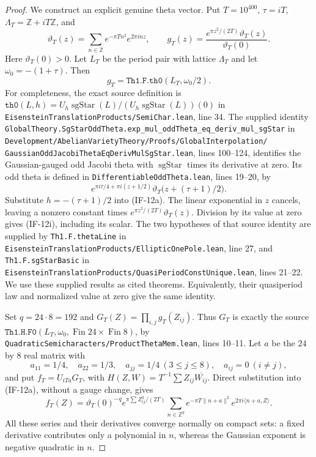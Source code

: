 \begin{proof}
We construct an explicit genuine theta vector. Put $T=10^{400}$,
$\tau=iT$, $\Lambda_T=\mathbb Z+iT\mathbb Z$, and
\[
 \vartheta_T(z)=\sum_{n\in\mathbb Z}
                   e^{-\pi T n^2}e^{2\pi i n z},\qquad
 g_T(z)=\frac{e^{\pi z^2/(2T)}\vartheta_T(z)}{\vartheta_T(0)}.
                                                               \tag{IF-12h}
\]
Here $\vartheta_T(0)>0$. Let $L_T$ be the period pair with lattice
$\Lambda_T$ and let $\omega_0=-(1+\tau)$. Then
\[
                g_T=\texttt{Th1.F.th0}(L_T,\omega_0/2).
                                                               \tag{IF-12i}
\]
For completeness, the exact source definition is
$\texttt{th0}(L,h)=U_h\operatorname{sgStar}(L)/
(U_h\operatorname{sgStar}(L))(0)$ in
\texttt{EisensteinTranslationProducts/SemiChar.lean}, line 34.
The supplied identity
\texttt{GlobalTheory.SgStarOddTheta.exp\_mul\_oddTheta\_eq\_deriv\_mul\_sgStar}
in \texttt{Development/AbelianVarietyTheory/Proofs/GlobalInterpolation/}
\texttt{GaussianOddJacobiThetaEqDerivMulSgStar.lean}, lines 100--124,
identifies the Gaussian-gauged odd Jacobi theta with
$\operatorname{sgStar}$ times its derivative at zero. Its odd theta
is defined in \texttt{DifferentiableOddTheta.lean}, lines 19--20, by
\[
 e^{\pi i\tau/4+\pi i(z+1/2)}
       \vartheta_T\bigl(z+(\tau+1)/2\bigr).
\]
Substitute $h=-(\tau+1)/2$ into (IF-12a). The linear exponential
in $z$ cancels, leaving a nonzero constant times
$e^{\pi z^2/(2T)}\vartheta_T(z)$. Division by its value at zero
gives (IF-12i), including its scalar. The two hypotheses of that
source identity are supplied by \texttt{Th1.F.thetaLine} in
\texttt{EisensteinTranslationProducts/EllipticOnePole.lean}, line 27,
and \texttt{Th1.F.sgStarBasic} in
\texttt{EisensteinTranslationProducts/QuasiPeriodConstUnique.lean},
lines 21--22. We use these supplied results as cited theorems.
Equivalently, their
quasiperiod law and normalized value at zero give the same identity.

Set $q=24\cdot8=192$ and
$G_T(Z)=\prod_{i,j}g_T(Z_{ij})$. Thus $G_T$ is exactly the source
$\texttt{Th1.H.F0}(L_T,\omega_0,\operatorname{Fin}24\times
\operatorname{Fin}8)$, by
\texttt{QuadraticSemicharacters/ProductThetaMem.lean}, lines 10--11.
Let $a$ be the $24$ by $8$ real matrix with
\[
 a_{11}=1/4,\quad a_{22}=1/3,\quad
 a_{jj}=1/4\ (3\le j\le8),\quad a_{ij}=0\ (i\ne j),
                                                               \tag{IF-12j}
\]
and put $f_T=U_{iTa}G_T$, with
$H(Z,W)=T^{-1}\sum Z_{ij}\overline{W_{ij}}$.
Direct substitution into (IF-12a), without a gauge change, gives
\[
 f_T(Z)=\vartheta_T(0)^{-q}e^{\pi\sum Z_{ij}^2/(2T)}
      \sum_{n\in\mathbb Z^q}
       e^{-\pi T\|n+a\|^2}e^{2\pi i\langle n+a,Z\rangle}.
                                                               \tag{IF-12k}
\]
All these series and their derivatives converge normally on compact
sets: a fixed derivative contributes only a polynomial in $n$,
whereas the Gaussian exponent is negative quadratic in $n$.


\end{proof}
